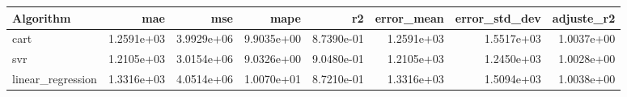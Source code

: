 \begin{tabular}{lrrrrrrr}
\toprule
Algorithm & mae & mse & mape & r2 & error_mean & error_std_dev & adjuste_r2 \\
\midrule
cart & 1.2591e+03 & 3.9929e+06 & 9.9035e+00 & 8.7390e-01 & 1.2591e+03 & 1.5517e+03 & 1.0037e+00 \\
svr & 1.2105e+03 & 3.0154e+06 & 9.0326e+00 & 9.0480e-01 & 1.2105e+03 & 1.2450e+03 & 1.0028e+00 \\
linear_regression & 1.3316e+03 & 4.0514e+06 & 1.0070e+01 & 8.7210e-01 & 1.3316e+03 & 1.5094e+03 & 1.0038e+00 \\
\bottomrule
\end{tabular}
